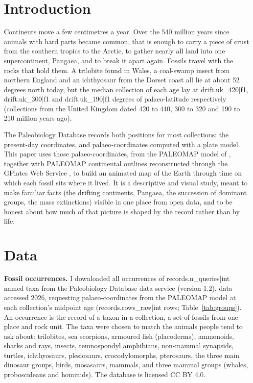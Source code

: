 \documentclass[11pt,a4paper]{article}
\begin{document}
\section{Introduction}
Continents move a few centimetres a year. Over the 540 million years since animals with hard parts became common, that is enough to carry a piece of crust from the southern tropics to the Arctic, to gather nearly all land into one supercontinent, Pangaea, and to break it apart again. Fossils travel with the rocks that hold them. A trilobite found in Wales, a coal-swamp insect from northern England and an ichthyosaur from the Dorset coast all lie at about 52 degrees north today, but the median collection of each age lay at {{drift.uk_420|f1}}, {{drift.uk_300|f1}} and {{drift.uk_190|f1}} degrees of palaeo-latitude respectively (collections from the United Kingdom dated 420 to 440, 300 to 320 and 190 to 210 million years ago).

The Paleobiology Database \citep{peters2016} records both positions for most collections: the present-day coordinates, and palaeo-coordinates computed with a plate model. This paper uses those palaeo-coordinates, from the PALEOMAP model of \citet{scotese2016}, together with PALEOMAP continental outlines reconstructed through the GPlates Web Service \citep{muller2018}, to build an animated map of the Earth through time on which each fossil sits where it lived. It is a descriptive and visual study, meant to make familiar facts (the drifting continents, Pangaea, the succession of dominant groups, the mass extinctions) visible in one place from open data, and to be honest about how much of that picture is shaped by the record rather than by life.

\section{Data}
\textbf{Fossil occurrences.} I downloaded all occurrences of {{records.n_queries|int}} named taxa from the Paleobiology Database data service (version 1.2), data accessed 2026, requesting palaeo-coordinates from the PALEOMAP model at each collection's midpoint age ({{records.rows_raw|int}} rows; Table~\ref{tab:groups}). An occurrence is the record of a taxon in a collection, a set of fossils from one place and rock unit. The taxa were chosen to match the animals people tend to ask about: trilobites, sea scorpions, armoured fish (placoderms), ammonoids, sharks and rays, insects, temnospondyl amphibians, non-mammal synapsids, turtles, ichthyosaurs, plesiosaurs, crocodylomorphs, pterosaurs, the three main dinosaur groups, birds, mosasaurs, mammals, and three mammal groups (whales, proboscideans and hominids). The database is licensed CC BY 4.0.
\end{document}
